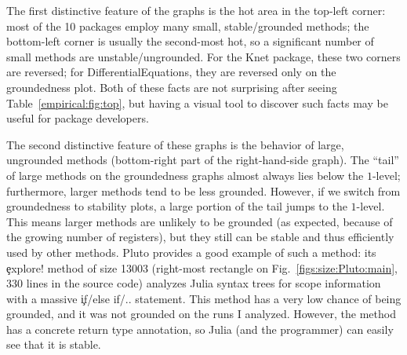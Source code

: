 The first distinctive feature of the graphs is the hot area in the top-left
corner: most of the 10 packages employ many small, stable/grounded methods;
the bottom-left corner is usually the second-most hot, so a significant number
of small methods are unstable/ungrounded. For the Knet package,
these two corners are reversed; for DifferentialEquations, they are reversed
only on the groundedness plot. Both of these facts are not surprising after seeing
Table~\ref{empirical:fig:top}, but having a visual tool to discover such facts
may be useful for package developers.

The second distinctive feature of these graphs is the behavior of large,
ungrounded methods (bottom-right part of the right-hand-side graph). The
``tail'' of large methods on the groundedness graphs almost always lies below
the $1$-level; furthermore, larger methods tend to be less grounded.
However, if we switch from groundedness to stability plots, a large portion of
the tail jumps to the $1$-level. This means larger methods are unlikely to be
grounded (as expected, because of the growing number of registers), but they
still can be stable and thus efficiently used by other methods. Pluto provides a
good example of such a method: its \c{explore!} method of size 13003 (right-most
rectangle on Fig.~\ref{figs:size:Pluto:main}, 330 lines in the source code) analyzes
Julia syntax trees for scope information with a massive \c{if/else if/..} statement.
This method has a very low chance of being grounded, and it was not grounded on the
runs I analyzed. However, the method has a concrete return type annotation, so
Julia (and the programmer) can easily see that it is stable.



